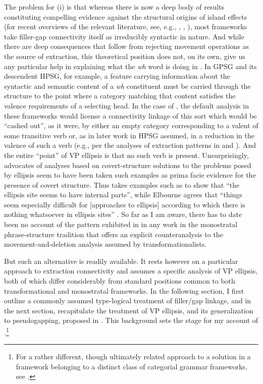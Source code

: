 \documentclass[output=paper,colorlinks,citecolor=brown]{langscibook}
\begin{document}
The problem for (i) is that whereas there is now a deep body of
results constituting compelling evidence against the structural
origins of island effects (for recent overviews of the relevant
literature, see, e.g., \citet{chaves-putnam2020}, \citet{kubotalevineBook}, \citet{liu-et-al2022}),
most frameworks take filler-gap connectivity itself as irreducibly
syntactic in nature. And while there are deep consequences that follow
from rejecting movement operations as the source of extraction, this
theoretical position does not, on its own, give us any particular help
in explaining what the \textit{wh} word is doing in . In
GPSG and its descendent HPSG, for example, a feature carrying
information about the syntactic and semantic content of a \textit{wh}
constituent must be carried through the structure to the point where a
category matching that content satisfies the valence requirements of a
selecting head. In the case of , the default analysis
in these frameworks would license a connectivity linkage of this sort
which would be ``cashed out'', as it were, by either an empty category
corresponding to a valent of some transitive verb or, as in later
work in HPSG assumed, in a reduction in the valence of such a verb
(e.g., per the analyses of extraction patterns in \citet{NoordBouma94} and
\citet{BoumaMaloufea01}). And the entire ``point'' of VP ellipsis is that no such
verb is present. Unsurprisingly, advocates of analyses based on
covert-structure solutions to the problems posed by ellipsis seem to
have been taken such examples as prima facie evidence for the presence
of covert structure.  Thus \citet{johnson2001} takes examples such as
 to show that ``the ellipsis site seems to have
internal parts'', while Elbourne agrees that ``things seem especially
difficult for [approaches to ellipsis] according to which there is
nothing whatsoever in ellipsis sites'' \citep[216]{Elbourne2008}.  So far as I
am aware, there has to date been no account of the pattern exhibited
in  in any work in the monostratal phrase-structure
tradition that offers an explicit counteranalysis to the
movement-and-deletion analysis assumed by transformationalists.

But such an alternative is readily available. It rests however on a
particular approach to extraction connectivity and assumes a specific
analysis of VP ellipsis, both of which differ considerably from
standard positions common to both transformational and monostratal
frameworks. In the following section, I first outline a commonly
assumed type-logical treatment of filler/gap linkage, and in the next
section, recapitulate the treatment of VP ellipsis, and its
generalization to pseudogapping, proposed in
\citet{kubota-levine-pseudo}. This background sets the stage for my account
of .\footnote{For a rather different, though
ultimately related approach to a solution in a framework belonging to
a distinct class of categorial grammar frameworks, see \citet{jacobson1992}.}
\end{document}
